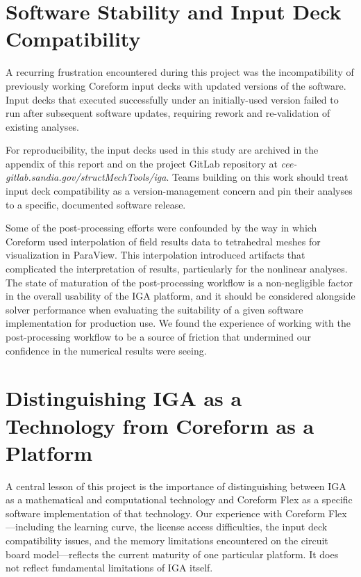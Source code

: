 \documentclass[12pt,report,justified]{SANDreport}
\begin{document}
\section{Software Stability and Input Deck Compatibility}

A recurring frustration encountered during this project was the incompatibility of
previously working Coreform input decks with updated versions of the software.  Input
decks that executed successfully under an initially-used version
failed to run after
subsequent software updates, requiring rework and re-validation of existing analyses.

For reproducibility, the input decks used in this study are archived in the appendix of
this report and on the project GitLab repository at
{\em cee-gitlab.sandia.gov/structMechTools/iga}.  Teams building on this work should
treat input deck compatibility as a version-management concern and pin their analyses to
a specific, documented software release.

Some of the post-processing efforts were confounded by the way in which Coreform used interpolation of field results data to tetrahedral meshes for visualization in ParaView.  This interpolation introduced artifacts that complicated the interpretation of results, particularly for the nonlinear analyses.  The state of maturation of the post-processing workflow is a non-negligible factor in the overall usability of the IGA platform, and it should be considered alongside solver performance when evaluating the suitability of a given software implementation for production use.  We found the experience of working with the post-processing workflow to be a source of friction that undermined our confidence in the numerical results were seeing.

\section{Distinguishing IGA as a Technology from Coreform as a Platform}

A central lesson of this project is the importance of distinguishing between IGA as a
mathematical and computational technology and Coreform Flex as a specific software
implementation of that technology.  Our experience with Coreform Flex---including the
learning curve, the license access difficulties, the input deck compatibility issues,
and the memory limitations encountered on the circuit board model---reflects the current
maturity of one particular platform.  It does not reflect fundamental limitations of IGA
itself.
\end{document}
